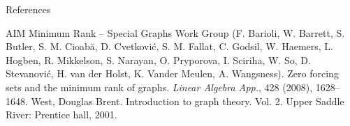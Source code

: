 \documentclass[final]{beamer}
\begin{document}
\begin{frame}{}
\begin{columns}[t]
\begin{column}{0.38 \linewidth}
\begin{block}{References}
\begin{thebibliography}{20}
 AIM Minimum Rank -- Special Graphs Work Group (F. Barioli, W. Barrett, S. Butler, S. M. Cioab\u{a}, D. Cvetkovi\'c, S. M. Fallat, C. Godsil, W. Haemers, L. Hogben,  R. Mikkelson,  S. Narayan,  O. Pryporova,   I. Sciriha,  W. So,   D. Stevanovi\'c,  H. van der Holst, K. Vander Meulen,  A. Wangsness).  Zero forcing sets and the minimum rank  of graphs.   {\em Linear Algebra App.}, 428 (2008),  1628--1648.
 West, Douglas Brent. Introduction to graph theory. Vol. 2. Upper Saddle River: Prentice hall, 2001.
\end{thebibliography}
\end{block}


\end{column}%
\end{columns}

\end{frame}
\end{document}
